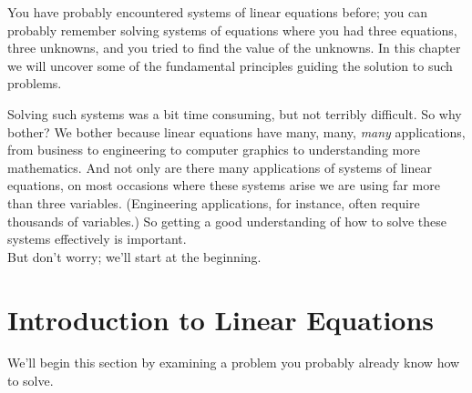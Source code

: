 You have probably encountered systems of linear equations before; you can probably remember solving systems of equations where you had three equations, three unknowns, and you tried to find the value of the unknowns. In this chapter we will uncover some of the fundamental principles guiding the solution to such problems.

Solving such systems was a bit time consuming, but not terribly difficult. So why bother? We bother because linear equations have many, many, \textit{many} applications, from business to engineering to computer graphics to understanding more mathematics. And not only are there many applications of systems of linear equations, on most occasions where these systems arise we are using far more than three variables. (Engineering applications, for instance, often require thousands of variables.) So getting a good understanding of how to solve these systems effectively is important.\\

But don't worry; we'll start at the beginning.

\section{Introduction to Linear Equations}\label{sec:intro}


We'll begin this section by examining a problem you probably already know how to solve.\\

